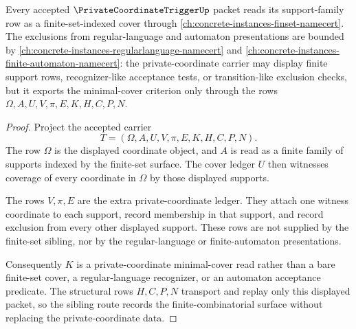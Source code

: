 \begin{theorem}
\label{thm:private-coordinate-trigger-finset-cover-route}
Every accepted $\PrivateCoordinateTriggerUp$ packet reads its support-family row as a finite-set-indexed cover through \autoref{ch:concrete-instances-finset-namecert}. The exclusions from regular-language and automaton presentations are bounded by \autoref{ch:concrete-instances-regularlanguage-namecert} and \autoref{ch:concrete-instances-finite-automaton-namecert}: the private-coordinate carrier may display finite support rows, recognizer-like acceptance tests, or transition-like exclusion checks, but it exports the minimal-cover criterion only through the rows $\Omega,A,U,V,\pi,E,K,H,C,P,N$.
\end{theorem}
\begin{proof}
Project the accepted carrier
$$
T=(\Omega,A,U,V,\pi,E,K,H,C,P,N).
$$
The row $\Omega$ is the displayed coordinate object, and $A$ is read as a finite family of supports indexed by the finite-set surface. The cover ledger $U$ then witnesses coverage of every coordinate in $\Omega$ by those displayed supports.

The rows $V,\pi,E$ are the extra private-coordinate ledger. They attach one witness coordinate to each support, record membership in that support, and record exclusion from every other displayed support. These rows are not supplied by the finite-set sibling, nor by the regular-language or finite-automaton presentations.

Consequently $K$ is a private-coordinate minimal-cover read rather than a bare finite-set cover, a regular-language recognizer, or an automaton acceptance predicate. The structural rows $H,C,P,N$ transport and replay only this displayed packet, so the sibling route records the finite-combinatorial surface without replacing the private-coordinate data.
\end{proof}


